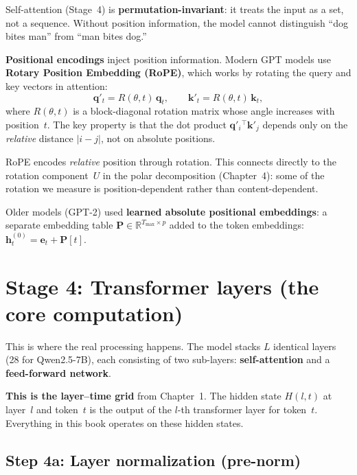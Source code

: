 \documentclass[11pt, twoside, openright]{memoir}
\begin{document}
Self-attention (Stage~4) is \textbf{permutation-invariant}: it treats the
input as a set, not a sequence.  Without position information, the model
cannot distinguish ``dog bites man'' from ``man bites dog.''

\textbf{Positional encodings} inject position information.  Modern GPT
models use \textbf{Rotary Position Embedding (RoPE)}, which works by
rotating the query and key vectors in attention:
\[
  \mathbf{q}'_t = R(\theta, t) \, \mathbf{q}_t,
  \qquad
  \mathbf{k}'_t = R(\theta, t) \, \mathbf{k}_t,
\]
where $R(\theta, t)$ is a block-diagonal rotation matrix whose angle
increases with position~$t$.  The key property is that the dot product
$\mathbf{q}'_i{}^\top \mathbf{k}'_j$ depends only on the \emph{relative}
distance $|i - j|$, not on absolute positions.

\begin{keyidea}
RoPE encodes \emph{relative} position through rotation.  This connects
directly to the rotation component~$U$ in the polar decomposition
(Chapter~4): some of the rotation we measure is position-dependent
rather than content-dependent.
\end{keyidea}

Older models (GPT-2) used \textbf{learned absolute positional embeddings}:
a separate embedding table $\mathbf{P} \in \mathbb{R}^{T_{\max} \times p}$
added to the token embeddings:
$\mathbf{h}^{(0)}_t = \mathbf{e}_t + \mathbf{P}[t]$.

\section{Stage 4: Transformer layers (the core computation)}

This is where the real processing happens.  The model stacks $L$ identical
layers (28 for Qwen2.5-7B), each consisting of two sub-layers:
\textbf{self-attention} and a \textbf{feed-forward network}.

\begin{keyidea}
\textbf{This is the layer--time grid} from Chapter~1.  The hidden state
$H(l,t)$ at layer~$l$ and token~$t$ is the output of the $l$-th transformer
layer for token~$t$.  Everything in this book operates on these hidden
states.
\end{keyidea}

\subsection{Step 4a: Layer normalization (pre-norm)}
\end{document}
